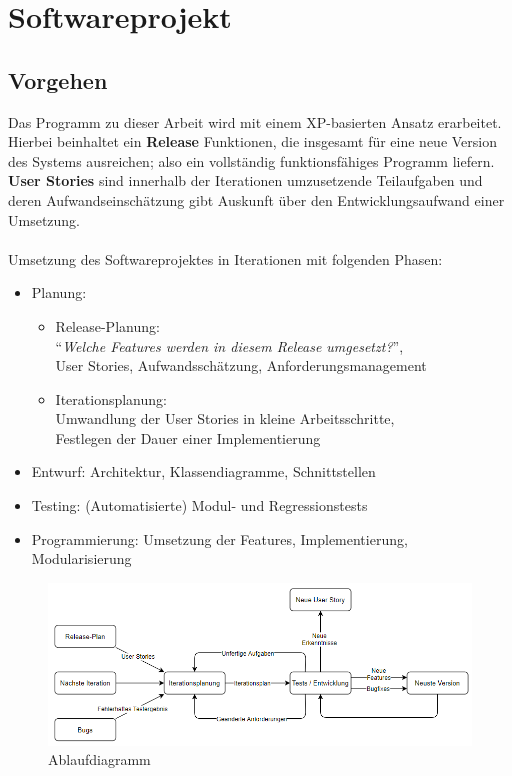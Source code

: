 \documentclass[11pt]{article}
\begin{document}
    \section{Softwareprojekt}

    \subsection{Vorgehen}
    Das Programm zu dieser Arbeit wird mit einem XP-basierten Ansatz erarbeitet.
    Hierbei beinhaltet ein \textbf{Release} Funktionen, die insgesamt für eine neue Version des Systems ausreichen;
    also ein vollständig funktionsfähiges Programm liefern.
    \textbf{User Stories} sind innerhalb der Iterationen umzusetzende Teilaufgaben und deren Aufwandseinschätzung gibt
    Auskunft über den Entwicklungsaufwand einer Umsetzung.\\~\\
    Umsetzung des Softwareprojektes in Iterationen mit folgenden Phasen:
    \begin{itemize}
        \item Planung:
        \begin{itemize}
            \item Release-Planung:\\"`\textit{Welche Features werden in diesem Release umgesetzt?}"',\\User Stories,
            Aufwandsschätzung, Anforderungsmanagement
            \item Iterationsplanung:\\Umwandlung der User Stories in kleine Arbeitsschritte,\\Festlegen der Dauer einer
            Implementierung
        \end{itemize}
        \item Entwurf: Architektur, Klassendiagramme, Schnittstellen
        \item Testing: (Automatisierte) Modul- und Regressionstests
        \item Programmierung: Umsetzung der Features, Implementierung, Modularisierung
    \end{itemize}
    \begin{figure}[H]
        \centering
        \includegraphics[width=15cm]{../images/extreme_programming.PNG}
        \caption{Ablaufdiagramm}
    \end{figure}
\end{document}
